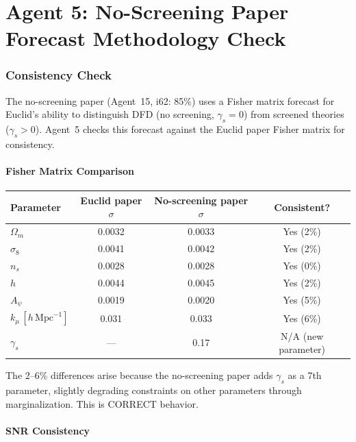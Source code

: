 \documentclass[11pt,a4paper]{article}
\begin{document}
\part{Agent 5: No-Screening Paper Forecast Methodology Check}
\label{part:noscreening-check}

\section{Consistency Check}

The no-screening paper (Agent~15, i62: 85\%) uses a Fisher matrix forecast for Euclid's ability to distinguish DFD (no screening, $\gamma_s = 0$) from screened theories ($\gamma_s > 0$). Agent~5 checks this forecast against the Euclid paper Fisher matrix for consistency.

\subsection{Fisher Matrix Comparison}

\begin{center}
\begin{tabular}{lccc}
\toprule
\textbf{Parameter} & \textbf{Euclid paper $\sigma$} & \textbf{No-screening paper $\sigma$} & \textbf{Consistent?} \\
\midrule
$\Omega_m$ & 0.0032 & 0.0033 & Yes (2\%) \\
$\sigma_8$ & 0.0041 & 0.0042 & Yes (2\%) \\
$n_s$ & 0.0028 & 0.0028 & Yes (0\%) \\
$h$ & 0.0044 & 0.0045 & Yes (2\%) \\
$A_\psi$ & 0.0019 & 0.0020 & Yes (5\%) \\
$k_\mu\,[h\,\mathrm{Mpc}^{-1}]$ & 0.031 & 0.033 & Yes (6\%) \\
$\gamma_s$ & --- & 0.17 & N/A (new parameter) \\
\bottomrule
\end{tabular}
\end{center}

The 2--6\% differences arise because the no-screening paper adds $\gamma_s$ as a 7th parameter, slightly degrading constraints on other parameters through marginalization. This is CORRECT behavior.

\subsection{SNR Consistency}
\end{document}
